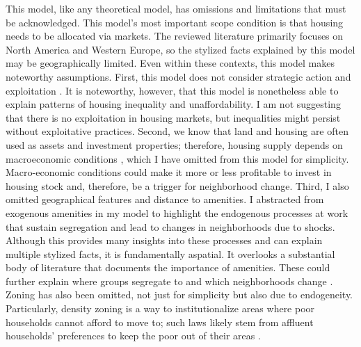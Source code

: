 \documentclass[a4paper,12pt]{article}
\begin{document}
This model, like any theoretical model, has omissions and limitations that must be acknowledged. This model's most important scope condition is that housing needs to be allocated via markets. The reviewed literature primarily focuses on North America and Western Europe, so the stylized facts explained by this model may be geographically limited. Even within these contexts, this model makes noteworthy assumptions. First, this model does not consider strategic action and exploitation \citep{desmondPoorPayMore2019}. It is noteworthy, however, that this model is nonetheless able to explain patterns of housing inequality and unaffordability. I am not suggesting that there is no exploitation in housing markets, but inequalities might persist without exploitative practices. Second, we know that land and housing are often used as assets and investment properties; therefore, housing supply depends on macroeconomic conditions \citep{bayerSpeculativeFeverInvestor2021}, which I have omitted from this model for simplicity. Macro-economic conditions could make it more or less profitable to invest in housing stock and, therefore, be a trigger for neighborhood change. Third, I also omitted geographical features and distance to amenities. I abstracted from exogenous amenities in my model to highlight the endogenous processes at work that sustain segregation and lead to changes in neighborhoods due to shocks. Although this provides many insights into these processes and can explain multiple stylized facts, it is fundamentally aspatial. It overlooks a substantial body of literature that documents the importance of amenities. These could further explain where groups segregate to \citep{gaigneWhoLivesWhere2022} and which neighborhoods change \citep{leeNaturalAmenitiesNeighbourhood2018}. Zoning has also been omitted, not just for simplicity but also due to endogeneity. Particularly, density zoning is a way to institutionalize areas where poor households cannot afford to move to; such laws likely stem from affluent households' preferences to keep the poor out of their areas \citep{rothwellDensityZoningClass2010}.
\end{document}
